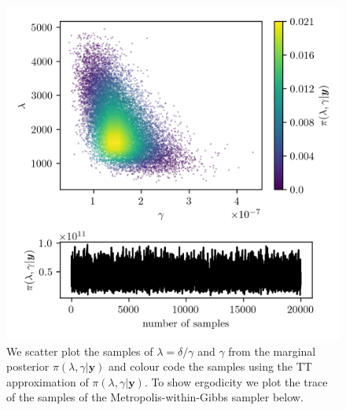 \begin{figure}[ht!]
	\centering
	\includegraphics{ScatterplusHistoPlusTT.png}
	\caption[Scatter plot of samples from marginal posterior, including weighting from TT approximation; additional trace plot of the marginal posterior samples.]{We scatter plot the samples of $\lambda = \delta / \gamma $ and $\gamma$ from the marginal posterior $\pi(\lambda , \gamma  | \bm{y})$ and colour code the samples using the TT approximation of $\pi(\lambda , \gamma  | \bm{y})$. To show ergodicity we plot the trace of the samples of the Metropolis-within-Gibbs sampler below.}
	\label{fig:ScatterPlotTT}
\end{figure}


